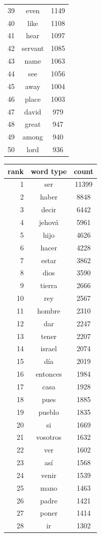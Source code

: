 \begin{figure}
\begin{tiny}
\begin{centering}
\begin{tabular}{|r|c|c|}
39 & even & 1149 \\
40 & like & 1108 \\
41 & hear & 1097 \\
42 & servant & 1085 \\
43 & name & 1063 \\
44 & see & 1056 \\
45 & away & 1004 \\
46 & place & 1003 \\
47 & david & 979 \\
48 & great & 947 \\
49 & among & 940 \\
50 & lord & 936 \\
    \hline
  \end{tabular}
  \quad
  \begin{tabular}{|r|c|c|}
    \hline
    rank & word type & count \\
    \hline
1 & ser & 11399 \\
2 & haber & 8848 \\
3 & decir & 6442 \\
4 & jehová & 5961 \\
5 & hijo & 4626 \\
6 & hacer & 4228 \\
7 & estar & 3862 \\
8 & dios & 3590 \\
9 & tierra & 2666 \\
10 & rey & 2567 \\
11 & hombre & 2310 \\
12 & dar & 2247 \\
13 & tener & 2207 \\
14 & israel & 2074 \\
15 & día & 2019 \\
16 & entonces & 1984 \\
17 & casa & 1928 \\
18 & pues & 1885 \\
19 & pueblo & 1835 \\
20 & si & 1669 \\
21 & vosotros & 1632 \\
22 & ver & 1602 \\
23 & así & 1568 \\
24 & venir & 1539 \\
25 & mano & 1463 \\
26 & padre & 1421 \\
27 & poner & 1414 \\
28 & ir & 1302 \\

\end{tabular}
\end{centering}
\end{tiny}
\end{figure}
